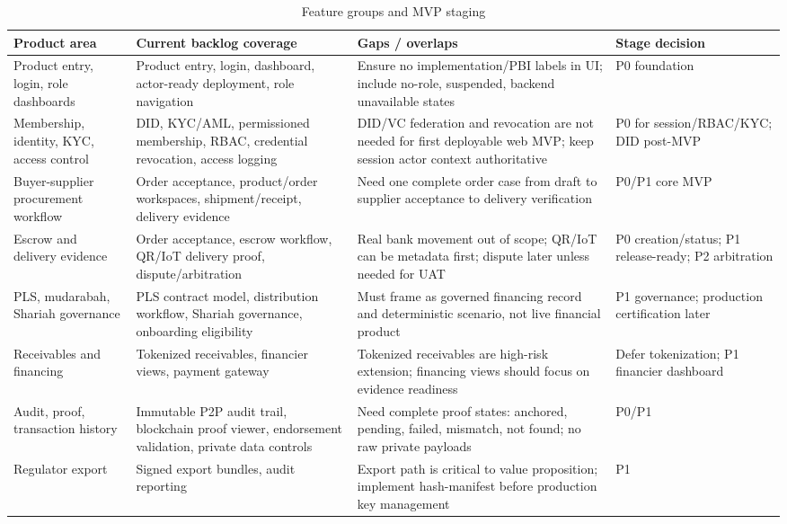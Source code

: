 \documentclass[conference]{IEEEtran}
\begin{document}
\begin{table}[t]
\caption{Feature groups and MVP staging}
\label{tab:feature-map}
\scriptsize
\begin{tabularx}{\textwidth}{P{3.4cm} P{4.2cm} P{4.1cm} Y}
\toprule
Product area & Current backlog coverage & Gaps / overlaps & Stage decision \\
\midrule
Product entry, login, role dashboards & Product entry, login, dashboard, actor-ready deployment, role navigation & Ensure no implementation/PBI labels in UI; include no-role, suspended, backend unavailable states & P0 foundation \\
Membership, identity, KYC, access control & DID, KYC/AML, permissioned membership, RBAC, credential revocation, access logging & DID/VC federation and revocation are not needed for first deployable web MVP; keep session actor context authoritative & P0 for session/RBAC/KYC; DID post-MVP \\
Buyer-supplier procurement workflow & Order acceptance, product/order workspaces, shipment/receipt, delivery evidence & Need one complete order case from draft to supplier acceptance to delivery verification & P0/P1 core MVP \\
Escrow and delivery evidence & Order acceptance, escrow workflow, QR/IoT delivery proof, dispute/arbitration & Real bank movement out of scope; QR/IoT can be metadata first; dispute later unless needed for UAT & P0 creation/status; P1 release-ready; P2 arbitration \\
PLS, mudarabah, Shariah governance & PLS contract model, distribution workflow, Shariah governance, onboarding eligibility & Must frame as governed financing record and deterministic scenario, not live financial product & P1 governance; production certification later \\
Receivables and financing & Tokenized receivables, financier views, payment gateway & Tokenized receivables are high-risk extension; financing views should focus on evidence readiness & Defer tokenization; P1 financier dashboard \\
Audit, proof, transaction history & Immutable P2P audit trail, blockchain proof viewer, endorsement validation, private data controls & Need complete proof states: anchored, pending, failed, mismatch, not found; no raw private payloads & P0/P1 \\
Regulator export & Signed export bundles, audit reporting & Export path is critical to value proposition; implement hash-manifest before production key management & P1 \\

\end{tabularx}
\end{table}
\end{document}
